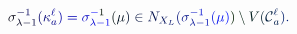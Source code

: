 \documentclass[12pt]{article}
\begin{document}
\makeatletter
\renewcommand*{\@textcolor}[3]{%
  \protect\leavevmode
  \begingroup
    \color#1{#2}#3%
  \endgroup
}
\makeatother
\begin{displaymath}
\mathcolor[RGB]{0,0,15}{\sigma} _ { \mathcolor[RGB]{0,0,30}{\lambda} \mathcolor[RGB]{0,0,45}{-} \mathcolor[RGB]{0,0,60}{1} } ^ { \mathcolor[RGB]{0,0,75}{-} \mathcolor[RGB]{0,0,90}{1} } \mathcolor[RGB]{0,0,105}{(} \mathcolor[RGB]{0,0,120}{\kappa} _ { \mathcolor[RGB]{0,0,135}{a} } ^ { \mathcolor[RGB]{0,0,150}{\ell} } \mathcolor[RGB]{0,0,165}{)} \mathcolor[RGB]{0,0,180}{=} \mathcolor[RGB]{0,0,195}{\sigma} _ { \mathcolor[RGB]{0,0,210}{\lambda} \mathcolor[RGB]{0,0,225}{-} \mathcolor[RGB]{0,0,240}{1} } ^ { \mathcolor[RGB]{0,0,255}{-} \mathcolor[RGB]{0,15,0}{1} } \mathcolor[RGB]{0,15,15}{(} \mathcolor[RGB]{0,15,30}{\mu} \mathcolor[RGB]{0,15,45}{)} \mathcolor[RGB]{0,15,60}{\in} \mathcolor[RGB]{0,15,75}{N} _ { \mathcolor[RGB]{0,15,90}{X} _ { \mathcolor[RGB]{0,15,105}{L} } } \mathcolor[RGB]{0,15,120}{(} \mathcolor[RGB]{0,15,135}{\sigma} _ { \mathcolor[RGB]{0,15,150}{\lambda} \mathcolor[RGB]{0,15,165}{-} \mathcolor[RGB]{0,15,180}{1} } ^ { \mathcolor[RGB]{0,15,195}{-} \mathcolor[RGB]{0,15,210}{1} } \mathcolor[RGB]{0,15,225}{(} \mathcolor[RGB]{0,15,240}{\mu} \mathcolor[RGB]{0,15,255}{)} \mathcolor[RGB]{0,30,0}{)} \mathcolor[RGB]{0,30,15}{\setminus} \mathcolor[RGB]{0,30,30}{V} \mathcolor[RGB]{0,30,45}{(} \mathcal { \mathcolor[RGB]{0,30,60}{C} } _ { \mathcolor[RGB]{0,30,75}{a} } ^ { \mathcolor[RGB]{0,30,90}{\ell} } \mathcolor[RGB]{0,30,105}{)} \mathcolor[RGB]{0,30,120}{.}
\end{displaymath}
\end{document}
